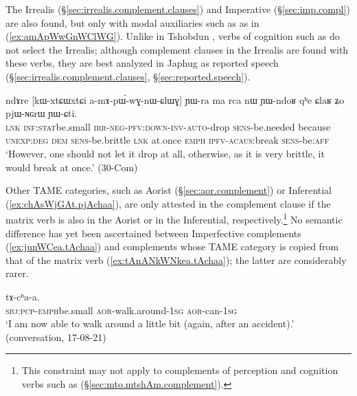 The Irrealis (§\ref{sec:irrealis.complement.clauses}) and Imperative (§\ref{sec:imp.compl}) are also found, but only with modal auxiliaries such as  as in (\ref{ex:amApWwGnWClWG}). Unlike in Tshobdun \citep[807]{jackson07irrealis},  verbs of cognition such as  do not select the Irrealis; although complement clauses in the Irrealis are found with these verbs, they are best analyzed in Japhug as reported speech (§\ref{sec:irrealis.complement.clauses}, §\ref{sec:reported.speech}). 

\begin{exe}
\ex \label{ex:amApWwGnWClWG}
\gll  ndɤre [kɯ-xtɕɯ\redp{}xtɕi a-mɤ-pɯ́-wɣ-nɯ-ɕlɯɣ] ɲɯ-ra ma rca nɯ ɲɯ-ndoʁ qʰe ɕlaʁ ʑo pjɯ-ɴɢrɯ ɲɯ-ɕti. \\
\textsc{lnk} \textsc{inf}:\textsc{stat}\redp{}be.small \textsc{irr}-\textsc{neg}-\textsc{pfv}:\textsc{down}-\textsc{inv}-\textsc{auto}-drop \textsc{sens}-be.needed because \textsc{unexp}:\textsc{deg} \textsc{dem} \textsc{sens}-be.brittle \textsc{lnk} at.once \textsc{emph} \textsc{ipfv}-\textsc{acaus}:break \textsc{sens}-be:\textsc{aff} \\
\glt `However, one should not let it drop at all, otherwise, as it is very brittle, it would break at once.' (30-Com)
\end{exe}

Other TAME categories, such as Aorist (§\ref{sec:aor.complement}) or Inferential (\ref{ex:chAsWjGAt.pjAchaa}), are only attested in the complement clause if the matrix verb is also in the Aorist or in the Inferential, respectively.\footnote{This constraint may not apply to complements of perception and cognition verbs such as  (§\ref{sec:mto.mtshAm.complement}). } No semantic difference has yet been ascertained between Imperfective complements (\ref{ex:junWCea.tAchaa}) and complements whose TAME category is copied from that of the matrix verb (\ref{ex:tAnANkWNkea.tAchaa}); the latter are considerably rarer.

\begin{exe}
\ex \label{ex:tAnANkWNkea.tAchaa}
  tɤ-cʰa-a. \\
 \textsc{sbj}:\textsc{pcp}-\textsc{emph}\redp{}be.small \textsc{aor}-walk.around-\textsc{1sg} \textsc{aor}-can-\textsc{1sg} \\
 \glt `I am now able to walk around a little bit (again, after an accident).' (conversation, 17-08-21)
\end{exe}

